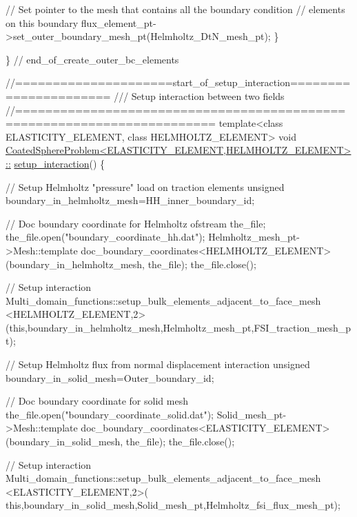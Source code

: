 \begin{DoxyCodeInclude}
{   \textcolor{comment}{// Set pointer to the mesh that contains all the boundary condition}
   \textcolor{comment}{// elements on this boundary}
   flux\_element\_pt->set\_outer\_boundary\_mesh\_pt(Helmholtz\_DtN\_mesh\_pt);
  \}
 
\} \textcolor{comment}{// end\_of\_create\_outer\_bc\_elements}





\textcolor{comment}{//=====================start\_of\_setup\_interaction======================}\textcolor{comment}{}
\textcolor{comment}{/// Setup interaction between two fields}
\textcolor{comment}{}\textcolor{comment}{//========================================================================}
\textcolor{keyword}{template}<\textcolor{keyword}{class} ELASTICITY\_ELEMENT, \textcolor{keyword}{class} HELMHOLTZ\_ELEMENT>
\textcolor{keywordtype}{void} \hyperlink{classCoatedSphereProblem_aeea43c892871a6c65df992aedc3b3547}{CoatedSphereProblem<ELASTICITY\_ELEMENT,HELMHOLTZ\_ELEMENT>::}
\hyperlink{classCoatedSphereProblem_aeea43c892871a6c65df992aedc3b3547}{setup\_interaction}()
\{

 \textcolor{comment}{// Setup Helmholtz "pressure" load on traction elements}
 \textcolor{keywordtype}{unsigned} boundary\_in\_helmholtz\_mesh=HH\_inner\_boundary\_id;

 \textcolor{comment}{// Doc boundary coordinate for Helmholtz}
 ofstream the\_file;
 the\_file.open(\textcolor{stringliteral}{"boundary\_coordinate\_hh.dat"});
 Helmholtz\_mesh\_pt->Mesh::template doc\_boundary\_coordinates<HELMHOLTZ\_ELEMENT>
  (boundary\_in\_helmholtz\_mesh, the\_file);
 the\_file.close();

 \textcolor{comment}{// Setup interaction}
  Multi\_domain\_functions::setup\_bulk\_elements\_adjacent\_to\_face\_mesh
  <HELMHOLTZ\_ELEMENT,2>
  (\textcolor{keyword}{this},boundary\_in\_helmholtz\_mesh,Helmholtz\_mesh\_pt,FSI\_traction\_mesh\_pt);

 \textcolor{comment}{// Setup Helmholtz flux from normal displacement interaction}
 \textcolor{keywordtype}{unsigned} boundary\_in\_solid\_mesh=Outer\_boundary\_id;

 \textcolor{comment}{// Doc boundary coordinate for solid mesh}
 the\_file.open(\textcolor{stringliteral}{"boundary\_coordinate\_solid.dat"});
 Solid\_mesh\_pt->Mesh::template doc\_boundary\_coordinates<ELASTICITY\_ELEMENT>
  (boundary\_in\_solid\_mesh, the\_file);
 the\_file.close();

 \textcolor{comment}{// Setup interaction}
 Multi\_domain\_functions::setup\_bulk\_elements\_adjacent\_to\_face\_mesh
  <ELASTICITY\_ELEMENT,2>(
   \textcolor{keyword}{this},boundary\_in\_solid\_mesh,Solid\_mesh\_pt,Helmholtz\_fsi\_flux\_mesh\_pt);

}
\end{DoxyCodeInclude}
